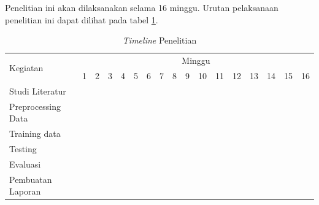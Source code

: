 Penelitian ini akan dilaksanakan selama 16 minggu. Urutan pelaksanaan penelitian ini dapat dilihat pada tabel \ref{tb:TimelinePenelitian}.
\newcommand{\w}{}
\newcommand{\G}{\cellcolor{gray}}
\begin{table}[h!]
  \caption{\label{tb:TimelinePenelitian}\emph{Timeline} Penelitian}
  \begin{tabular}{|p{3.5cm}|c|c|c|c|c|c|c|c|c|c|c|c|c|c|c|c|}

    \hline
    \multirow{2}{*}{Kegiatan} & \multicolumn{16}{|c|}{Minggu}                                                                       \\
    \cline{2-17}              &
    1                         & 2                             & 3  & 4  & 5  & 6  & 7  & 8  & 9  & 10 & 11 & 12 & 13 & 14 & 15 & 16 \\
    \hline

    Studi Literatur           &
    \G                        & \G                            & \w & \w & \w & \w & \w & \w & \w & \w & \w & \w & \w & \w & \w & \w \\
    \hline

    Preprocessing Data        &
    \w                        & \w                            & \G & \G & \G & \w & \w & \w & \w & \w & \w & \w & \w & \w & \w & \w \\
    \hline

    Training data             &
    \w                        & \w                            & \w & \w & \G & \G & \G & \G & \G & \G & \G & \G & \G & \w & \w & \w \\
    \hline

    Testing                   &
    \w                        & \w                            & \w & \w & \w & \w & \w & \w & \w & \w & \G & \G & \G & \w & \w & \w \\
    \hline

    Evaluasi                  &
    \w                        & \w                            & \w & \w & \w & \w & \w & \w & \w & \w & \w & \w & \w & \G & \G & \w \\
    \hline

    Pembuatan Laporan         &
    \G                        & \G                            & \G & \G & \G & \G & \G & \G & \G & \G & \G & \G & \G & \G & \G & \G \\
    \hline
  \end{tabular}
\end{table}
